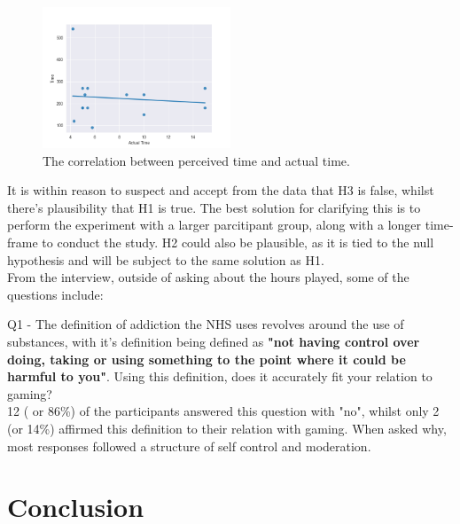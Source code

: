 \documentclass[conference]{IEEEtran}
\begin{document}
\begin{figure}[H]
\includegraphics[width = 0.5\textwidth]{Graph1}
\caption{The correlation between perceived time and actual time.}
\label{tab:figure5}
\end{figure}

It is within reason to suspect and accept from the data that H3 is false, whilst there's plausibility that H1 is true. The best solution for clarifying this is to perform the experiment with a larger parcitipant group, along with a longer time-frame to conduct the study. H2 could also be plausible, as it is tied to the null hypothesis and will be subject to the same solution as H1.\\

From the interview, outside of asking about the hours played, some of the questions include:

Q1 - The definition of addiction the NHS uses revolves around the use of substances, with it's definition being defined as \textbf{"not having control over doing, taking or using something to the point where it could be harmful to you"}. Using this definition, does it accurately fit your relation to gaming?\\

12 ( or 86\%) of the participants answered this question with "no", whilst only 2 (or 14\%) affirmed this definition to their relation with gaming. When asked why, most responses followed a structure of self control and moderation. 


\section{Conclusion}




\end{document}
